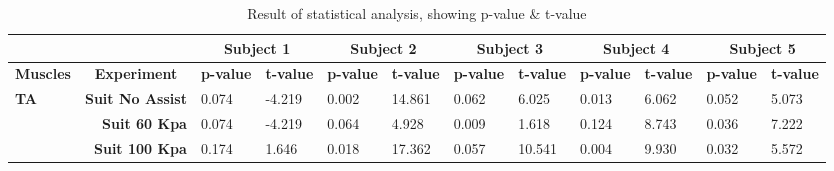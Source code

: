 \documentclass[letterpaper, 10 pt, conference]{ieeeconf}  %
\begin{document}
\begin{table*}[]
	\centering
	\caption{Result of statistical analysis, showing p-value \& t-value}
	\begin{tabular}{@{}lrllllllllll@{}}
		\toprule
		\multicolumn{1}{c}{}                 &                                         & \multicolumn{2}{c}{\textbf{Subject 1}}                                      & \multicolumn{2}{c}{\textbf{Subject 2}}                                      & \multicolumn{2}{c}{\textbf{Subject 3}}                                      & \multicolumn{2}{c}{\textbf{Subject 4}}                                      & \multicolumn{2}{c}{\textbf{Subject 5}}                                      \\ \midrule
		\multicolumn{1}{c}{\textbf{Muscles}} & \multicolumn{1}{c}{\textbf{Experiment}} & \multicolumn{1}{c}{\textbf{p-value}} & \multicolumn{1}{c}{\textbf{t-value}} & \multicolumn{1}{c}{\textbf{p-value}} & \multicolumn{1}{c}{\textbf{t-value}} & \multicolumn{1}{c}{\textbf{p-value}} & \multicolumn{1}{c}{\textbf{t-value}} & \multicolumn{1}{c}{\textbf{p-value}} & \multicolumn{1}{c}{\textbf{t-value}} & \multicolumn{1}{c}{\textbf{p-value}} & \multicolumn{1}{c}{\textbf{t-value}} \\ \midrule
		\textbf{TA}                          & \textbf{Suit No Assist}                 & 0.074                                & -4.219                               & 0.002                                & 14.861                               & 0.062                                & 6.025                                & 0.013                                & 6.062                                & 0.052                                & 5.073                                \\
		\textbf{}                            & \textbf{Suit 60 Kpa}                    & 0.074                                & -4.219                               & 0.064                                & 4.928                                & 0.009                                & 1.618                                & 0.124                                & 8.743                                & 0.036                                & 7.222                                \\
		\textbf{}                            & \textbf{Suit 100 Kpa}                   & 0.174                                & 1.646                                & 0.018                                & 17.362                               & 0.057                                & 10.541                               & 0.004                                & 9.930                                & 0.032                                & 5.572                                \\ \midrule

\end{tabular}
\end{table*}
\end{document}

